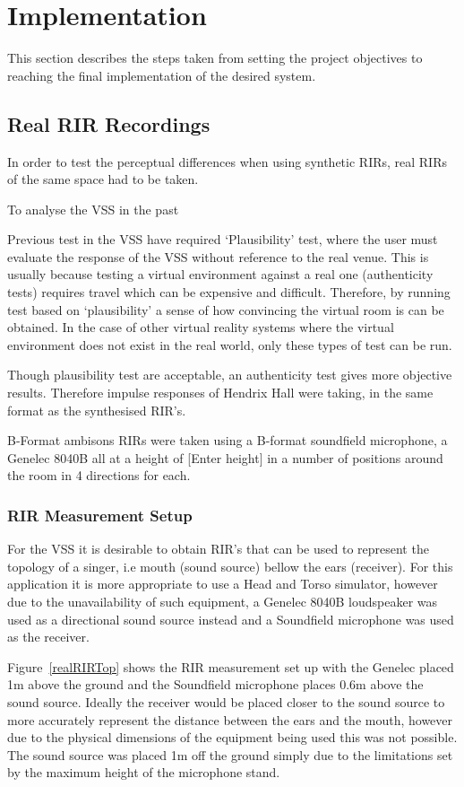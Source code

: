 \documentclass[../../main.tex]{subfiles}
\begin{document}
\section{Implementation}
	This section describes the steps taken from setting the project objectives to reaching the final implementation of the desired system.


\subsection{Real RIR Recordings}
	In order to test the perceptual differences when using synthetic RIRs, real RIRs of the same space had to be taken.

	To analyse the \ac{VSS} in the past 

	Previous test in the VSS have required ‘Plausibility’ test, where the user must evaluate the response of the VSS without reference to the real venue. This is usually because testing a virtual environment against a real one (authenticity tests) requires travel which can be expensive and difficult. Therefore, by running test based on ‘plausibility’ a sense of how convincing the virtual room is can be obtained. In the case of other virtual reality systems where the virtual environment does not exist in the real world, only these types of test can be run.

	Though plausibility test are acceptable, an authenticity test gives more objective results. Therefore impulse responses of Hendrix Hall were taking, in the same format as the synthesised RIR’s.

	B-Format ambisons RIRs were taken using a B-format soundfield microphone, a Genelec 8040B all at a height of [Enter height] in a number of positions around the room in 4 directions for each.


	\subsubsection{RIR Measurement Setup}

		For the \ac{VSS} it is desirable to obtain \ac{RIR}'s that can be used to represent the topology of a singer, i.e mouth (sound source) bellow the ears (receiver). For this application it is more appropriate to use a Head and Torso simulator, however due to the unavailability of such equipment, a Genelec 8040B \cite{genelec} loudspeaker was used as a directional sound source instead and a Soundfield microphone was used as the receiver.

		Figure~\ref{realRIRTop} shows the \ac{RIR} measurement set up with the Genelec placed 1m above the ground and the Soundfield microphone places 0.6m above the sound source. Ideally the receiver would be placed closer to the sound source to more accurately represent the distance between the ears and the mouth, however due to the physical dimensions of the equipment being used this was not possible. The sound source was placed 1m off the ground simply due to the limitations set by the maximum height of the microphone stand.
\end{document}
